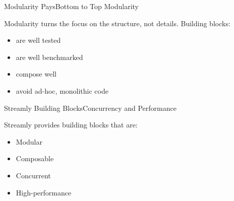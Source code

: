 \documentclass[17pt]{beamer}
\begin{document}
\begin{frame}{Modularity Pays}{Bottom to Top Modularity}

Modularity turns the focus on the structure, not details.
Building blocks:
\begin{itemize}
  \item are well tested
  \item are well benchmarked
  \item compose well
  \item avoid ad-hoc, monolithic code
\end{itemize}
\end{frame}

\begin{frame}{Streamly Building Blocks}{Concurrency and Performance}

Streamly provides building blocks that are:
\begin{itemize}
  \item Modular
  \item Composable
  \item Concurrent
  \item High-performance
\end{itemize}
\end{frame}
\end{document}
